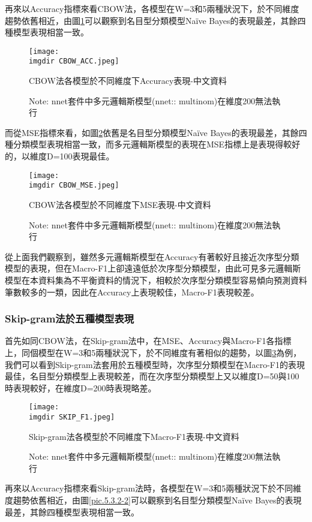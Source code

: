 	再來以Accuracy指標來看CBOW法，各模型在W=3和5兩種狀況下，於不同維度趨勢依舊相近，由圖\ref{pic.5.3.1-2}可以觀察到名目型分類模型Naïve Bayes的表現最差，其餘四種模型表現相當一致。
	
\begin{figure}[H]
    \centering
        \texttt{[image: \\imgdir CBOW\_ACC.jpeg]}
    \caption{CBOW法各模型於不同維度下Accuracy表現-中文資料}
    \label{pic.5.3.1-2}
    \caption*{\footnotesize{Note: nnet套件中多元邏輯斯模型(nnet:: multinom)在維度200無法執行}}
\end{figure}	

	而從MSE指標來看，如圖\ref{pic.5.3.1-3}依舊是名目型分類模型Naïve Bayes的表現最差，其餘四種分類模型表現相當一致，而多元邏輯斯模型的表現在MSE指標上是表現得較好的，以維度D=100表現最佳。
	
\begin{figure}[H]
    \centering
        \texttt{[image: \\imgdir CBOW\_MSE.jpeg]}
    \caption{CBOW法各模型於不同維度下MSE表現-中文資料}
    \label{pic.5.3.1-3}
    \caption*{\footnotesize{Note: nnet套件中多元邏輯斯模型(nnet:: multinom)在維度200無法執行}}
\end{figure}	
	
	從上面我們觀察到，雖然多元邏輯斯模型在Accuracy有著較好且接近次序型分類模型的表現，但在Macro-F1上卻遠遠低於次序型分類模型，由此可見多元邏輯斯模型在本資料集為不平衡資料的情況下，相較於次序型分類模型容易傾向預測資料筆數較多的一類，因此在Accuracy上表現較佳，Macro-F1表現較差。
	
	
\subsubsection{Skip-gram法於五種模型表現}

	首先如同CBOW法，在Skip-gram法中，在MSE、Accuracy與Macro-F1各指標上，同個模型在W=3和5兩種狀況下，於不同維度有著相似的趨勢，以圖\ref{pic.5.3.2-1}為例，我們可以看到Skip-gram法套用於五種模型時，次序型分類模型在Macro-F1的表現最佳，名目型分類模型上表現較差，而在次序型分類模型上又以維度D=50與100時表現較好，在維度D=200時表現略差。
	
\begin{figure}[h]
    \centering
        \texttt{[image: \\imgdir SKIP\_F1.jpeg]}
    \caption{Skip-gram法各模型於不同維度下Macro-F1表現-中文資料}
    \label{pic.5.3.2-1}
    \caption*{\footnotesize{Note: nnet套件中多元邏輯斯模型(nnet:: multinom)在維度200無法執行}}
\end{figure}
	
	再來以Accuracy指標來看Skip-gram法時，各模型在W=3和5兩種狀況下於不同維度趨勢依舊相近，由圖\ref{pic.5.3.2-2}可以觀察到名目型分類模型Naïve Bayes的表現最差，其餘四種模型表現相當一致。
	
